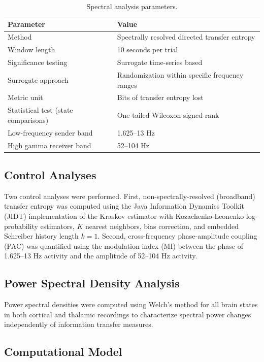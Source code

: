 \documentclass[12pt]{article}
\begin{document}
\begin{table}[H]
\centering
\caption{Spectral analysis parameters.}
\label{tab:spectral_params}
\begin{tabular}{ll}
\toprule
Parameter & Value \\
\midrule
Method & Spectrally resolved directed transfer entropy \\
Window length & 10 seconds per trial \\
Significance testing & Surrogate time-series based \\
Surrogate approach & Randomization within specific frequency ranges \\
Metric unit & Bits of transfer entropy lost \\
Statistical test (state comparisons) & One-tailed Wilcoxon signed-rank \\
Low-frequency sender band & 1.625--13 Hz \\
High gamma receiver band & 52--104 Hz \\
\bottomrule
\end{tabular}
\end{table}

\subsection{Control Analyses}

Two control analyses were performed. First, non-spectrally-resolved (broadband) transfer entropy was computed using the Java Information Dynamics Toolkit (JIDT) \citep{lizier2014jidt} implementation of the Kraskov estimator \citep{kraskov2004estimating} with Kozachenko-Leonenko log-probability estimators, $K$ nearest neighbors, bias correction, and embedded Schreiber history length $k=1$. Second, cross-frequency phase-amplitude coupling (PAC) was quantified using the modulation index (MI) \citep{tort2010measuring} between the phase of 1.625--13 Hz activity and the amplitude of 52--104 Hz activity.

\subsection{Power Spectral Density Analysis}

Power spectral densities were computed using Welch's method for all brain states in both cortical and thalamic recordings to characterize spectral power changes independently of information transfer measures.

\subsection{Computational Model}
\end{document}
